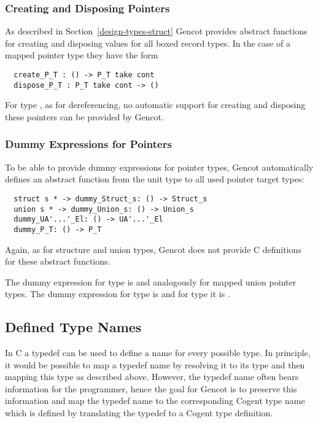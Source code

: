 \subsubsection{Creating and Disposing Pointers}

As described in Section~\ref{design-types-struct} Gencot provides abstract functions for creating and disposing
values for all boxed record types. In the case of a mapped pointer type  they have the form
\begin{verbatim}
  create_P_T : () -> P_T take cont
  dispose_P_T : P_T take cont -> ()
\end{verbatim}
For type , as for dereferencing, no
automatic support for creating and disposing these pointers can be provided by Gencot.

\subsubsection{Dummy Expressions for Pointers}

To be able to provide dummy expressions for pointer types, Gencot automatically defines an 
abstract function from the unit type to all used pointer target types:
\begin{verbatim}
  struct s * -> dummy_Struct_s: () -> Struct_s
  union s * -> dummy_Union_s: () -> Union_s
  dummy_UA'...'_El: () -> UA'...'_El
  dummy_P_T: () -> P_T
\end{verbatim}
Again, as for structure and union types, Gencot does not 
provide C definitions for these abstract functions.

The dummy expression for type  is  and analogously
for mapped union pointer types. The dummy expression for type  is 
 and for type  it is .

\subsection{Defined Type Names}
\label{design-types-typedef}

In C a typedef can be used to define a name for every possible type. In principle, it would be possible to
map a typedef name by resolving it to its type and then mapping this type as described above. However, the
typedef name often bears information for the programmer, hence the goal for Gencot is to preserve this information
and map the typedef name to the corresponding Cogent type name which is defined by translating the typedef
to a Cogent type definition.


